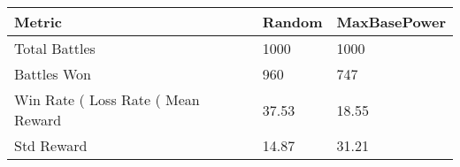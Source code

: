 \begin{tabular}{lll}
\toprule
Metric & Random & MaxBasePower \\
\midrule
Total Battles & 1000 & 1000 \\
Battles Won & 960 & 747 \\
Win Rate (%
Loss Rate (%
Mean Reward & 37.53 & 18.55 \\
Std Reward & 14.87 & 31.21 \\
\bottomrule
\end{tabular}
